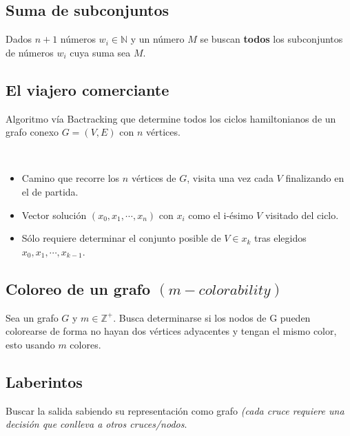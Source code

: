 \documentclass[tikz,11pt,fleqn]{book} %
\begin{document}
\subsection{Suma de subconjuntos}
Dados $n+1$ números $w_i\in\mathbb N$ y un número $M$ se buscan \textbf{todos} los subconjuntos de números $w_i$ cuya suma sea $M$.


\subsection{El viajero comerciante}

Algoritmo vía Bactracking que determine todos los ciclos hamiltonianos de un grafo conexo $G=(V,E)$ con $n$ vértices.

\begin{definition}~
	\begin{itemize}
		\item Camino que recorre los $n$ vértices de $G$, visita una vez cada $V$ finalizando en el de partida.
		\item Vector solución $(x_0,x_1,\cdots,x_n)$ con $x_i$ como el i-ésimo $V$ visitado del ciclo.
		\item Sólo requiere determinar el conjunto posible de $V\in x_k$ tras elegidos $x_0,x_1,\cdots,x_{k-1}$.
	\end{itemize}

\end{definition}


\subsection{Coloreo de un grafo $(m-colorability)$}
Sea un grafo $G$ y $m\in\mathbb Z^+$.
Busca determinarse si los nodos de G pueden colorearse de forma no hayan dos vértices adyacentes y tengan el mismo color, esto usando $m$ colores.


\subsection{Laberintos}
Buscar la salida sabiendo su representación como grafo \textit{(cada cruce requiere una decisión que conlleva a otros cruces/nodos}.


\end{document}
